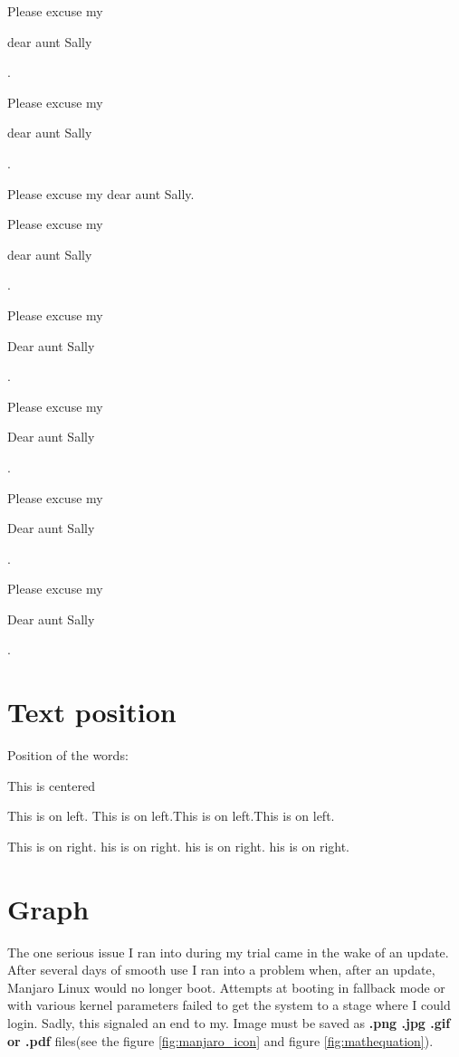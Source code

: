 \documentclass[11pt]{article}
\begin{document}
Please excuse my \begin{tiny} dear aunt Sally \end{tiny} .

Please excuse my \begin{small} dear aunt Sally \end{small} .

Please excuse my dear aunt Sally.

Please excuse my \begin{large} dear aunt Sally \end{large} .

Please excuse my \begin{Large} Dear aunt Sally \end{Large}.

Please excuse my \begin{LARGE} Dear aunt Sally \end{LARGE}.

Please excuse my \begin{huge} Dear aunt Sally \end{huge}.

Please excuse my \begin{Huge} Dear aunt Sally \end{Huge}.


\section{Text position}
Position of the words:

\begin{center} This is centered \end{center}

\begin{flushleft} This is on left. This is on left.This is on left.This is on left.\end{flushleft}

\begin{flushright} This is on right. his is on right. his is on right. his is on right. \end{flushright}


\section{Graph}
The one serious issue I ran into during my trial came in the wake of an update. After several days of smooth use I ran into a problem when, after an update, Manjaro Linux would no longer boot. Attempts at booting in fallback mode or with various kernel parameters failed to get the system to a stage where I could login. Sadly, this signaled an end to my. Image must be saved as \textbf{.png .jpg .gif or .pdf} files(see the figure \ref{fig:manjaro_icon} and figure \ref{fig:mathequation}).
\end{document}
